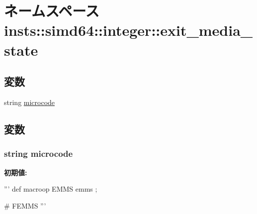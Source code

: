 \hypertarget{namespaceinsts_1_1simd64_1_1integer_1_1exit__media__state}{
\section{ネームスペース insts::simd64::integer::exit\_\-media\_\-state}
\label{namespaceinsts_1_1simd64_1_1integer_1_1exit__media__state}
}
\subsection*{変数}
\begin{DoxyCompactItemize}
\item 
string \hyperlink{namespaceinsts_1_1simd64_1_1integer_1_1exit__media__state_a770f11a173e99389a8802f0107ed8f52}{microcode}
\end{DoxyCompactItemize}


\subsection{変数}
\hypertarget{namespaceinsts_1_1simd64_1_1integer_1_1exit__media__state_a770f11a173e99389a8802f0107ed8f52}{
\subsubsection[{microcode}]{\setlength{\rightskip}{0pt plus 5cm}string {\bf microcode}}}
\label{namespaceinsts_1_1simd64_1_1integer_1_1exit__media__state_a770f11a173e99389a8802f0107ed8f52}
{\bfseries 初期値:}
\begin{DoxyCode}
'''
def macroop EMMS {
    emms
};

# FEMMS
'''
\end{DoxyCode}
